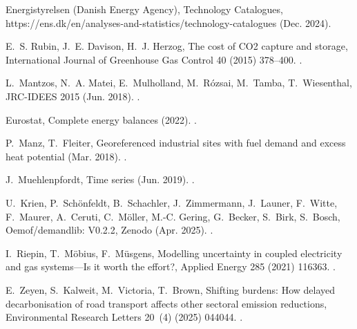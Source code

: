 \documentclass[preprint,12pt,sort&compress]{elsarticle}
\begin{document}
\begin{thebibliography}{10}
{Energistyrelsen (Danish Energy Agency)}, Technology {{Catalogues}}, https://ens.dk/en/analyses-and-statistics/technology-catalogues (Dec. 2024).

E.~S. Rubin, J.~E. Davison, H.~J. Herzog, The cost of {{CO2}} capture and storage, International Journal of Greenhouse Gas Control 40 (2015) 378--400.
\newblock \href {https://doi.org/10.1016/j.ijggc.2015.05.018} {}.

L.~Mantzos, N.~A. Matei, E.~Mulholland, M.~R{\'o}zsai, M.~Tamba, T.~Wiesenthal, {{JRC-IDEES}} 2015 (Jun. 2018).
\newblock \href {https://doi.org/10.2905/JRC-10110-10001} {}.

{Eurostat}, Complete energy balances (2022).
\newblock \href {https://doi.org/10.2908/NRG_BAL_C} {}.

P.~Manz, T.~Fleiter, Georeferenced industrial sites with fuel demand and excess heat potential (Mar. 2018).
\newblock \href {https://doi.org/10.5281/ZENODO.4687147} {}.

J.~Muehlenpfordt, Time series (Jun. 2019).
\newblock \href {https://doi.org/10.25832/TIME_SERIES/2019-06-05} {}.

U.~Krien, P.~Sch{\"o}nfeldt, B.~Schachler, J.~Zimmermann, J.~Launer, F.~Witte, F.~Maurer, A.~Ceruti, C.~M{\"o}ller, M.-C. Gering, G.~Becker, S.~Birk, S.~Bosch, Oemof/demandlib: V0.2.2, Zenodo (Apr. 2025).
\newblock \href {https://doi.org/10.5281/ZENODO.2553504} {}.

I.~Riepin, T.~M{\"o}bius, F.~M{\"u}sgens, Modelling uncertainty in coupled electricity and gas systems---{{Is}} it worth the effort?, Applied Energy 285 (2021) 116363.
\newblock \href {https://doi.org/10.1016/j.apenergy.2020.116363} {}.

E.~Zeyen, S.~Kalweit, M.~Victoria, T.~Brown, Shifting burdens: How delayed decarbonisation of road transport affects other sectoral emission reductions, Environmental Research Letters 20~(4) (2025) 044044.
\newblock \href {https://doi.org/10.1088/1748-9326/adc290} {}.


\end{thebibliography}
\end{document}
